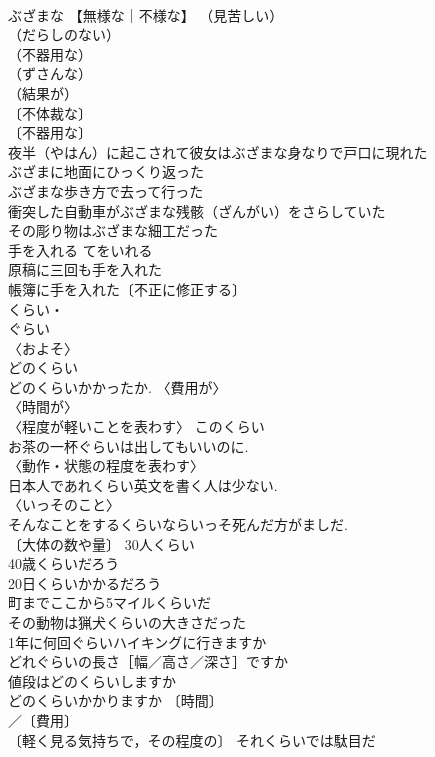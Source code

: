 \documentclass[8pt]{extreport}
\begin{document}
\begin{CJK}{UTF8}{min}
\\	ぶざまな	【無様な｜不様な】	（見苦しい）
\\	（だらしのない）
\\	（不器用な）
\\	（ずさんな）
\\	（結果が）
\\	〔不体裁な〕
\\	〔不器用な〕
\\	夜半（やはん）に起こされて彼女はぶざまな身なりで戸口に現れた 
\\	ぶざまに地面にひっくり返った 
\\	ぶざまな歩き方で去って行った 
\\	衝突した自動車がぶざまな残骸（ざんがい）をさらしていた 
\\	その彫り物はぶざまな細工だった 
\\	手を入れる	てをいれる	
\\	原稿に三回も手を入れた 
\\	帳簿に手を入れた〔不正に修正する〕 
\\	くらい・
\\	ぐらい		
\\	〈およそ〉 
\\	どのくらい 
\\	どのくらいかかったか. 〈費用が〉 
\\	〈時間が〉 
\\	〈程度が軽いことを表わす〉 このくらい 
\\	お茶の一杯ぐらいは出してもいいのに. 
\\	〈動作・状態の程度を表わす〉 
\\	日本人であれくらい英文を書く人は少ない. 
\\	〈いっそのこと〉 
\\	そんなことをするくらいならいっそ死んだ方がましだ. 
\\	〔大体の数や量〕 30人くらい 
\\	40歳くらいだろう 
\\	20日くらいかかるだろう 
\\	町までここから5マイルくらいだ 
\\	その動物は猟犬くらいの大きさだった 
\\	1年に何回ぐらいハイキングに行きますか 
\\	どれぐらいの長さ［幅／高さ／深さ］ですか 
\\	値段はどのくらいしますか 
\\	どのくらいかかりますか 〔時間〕
\\	／〔費用〕
\\	〔軽く見る気持ちで，その程度の〕 それくらいでは駄目だ 

\end{CJK}
\end{document}
